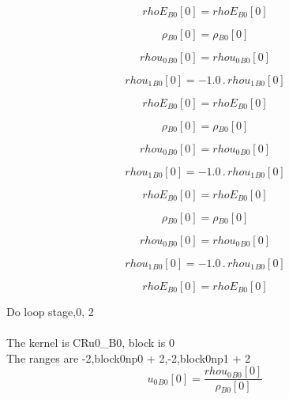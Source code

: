 \documentclass{article}
\begin{document}
\begin{dmath}{rhoE{_{B0}}}[{0}] = {rhoE{_{B0}}}[{0}]\end{dmath}

\begin{dmath}{\rho{_{B0}}}[{0}] = {\rho{_{B0}}}[{0}]\end{dmath}

\begin{dmath}{rhou_{0}{_{B0}}}[{0}] = {rhou_{0}{_{B0}}}[{0}]\end{dmath}

\begin{dmath}{rhou_{1}{_{B0}}}[{0}] = - 1.0 \,.\, {rhou_{1}{_{B0}}}[{0}]\end{dmath}

\begin{dmath}{rhoE{_{B0}}}[{0}] = {rhoE{_{B0}}}[{0}]\end{dmath}

\begin{dmath}{\rho{_{B0}}}[{0}] = {\rho{_{B0}}}[{0}]\end{dmath}

\begin{dmath}{rhou_{0}{_{B0}}}[{0}] = {rhou_{0}{_{B0}}}[{0}]\end{dmath}

\begin{dmath}{rhou_{1}{_{B0}}}[{0}] = - 1.0 \,.\, {rhou_{1}{_{B0}}}[{0}]\end{dmath}

\begin{dmath}{rhoE{_{B0}}}[{0}] = {rhoE{_{B0}}}[{0}]\end{dmath}

\begin{dmath}{\rho{_{B0}}}[{0}] = {\rho{_{B0}}}[{0}]\end{dmath}

\begin{dmath}{rhou_{0}{_{B0}}}[{0}] = {rhou_{0}{_{B0}}}[{0}]\end{dmath}

\begin{dmath}{rhou_{1}{_{B0}}}[{0}] = - 1.0 \,.\, {rhou_{1}{_{B0}}}[{0}]\end{dmath}

\begin{dmath}{rhoE{_{B0}}}[{0}] = {rhoE{_{B0}}}[{0}]\end{dmath}

\noindent Do loop stage,0, 2\\
\\\noindent The kernel is CRu0_B0, block is 0\\\noindent The ranges are -2,block0np0 + 2,-2,block0np1 + 2\\\begin{dmath}{u_{0}{_{B0}}}[{0}] = \frac{{rhou_{0}{_{B0}}}[{0}]}{{\rho{_{B0}}}[{0}]}\end{dmath}
\end{document}
